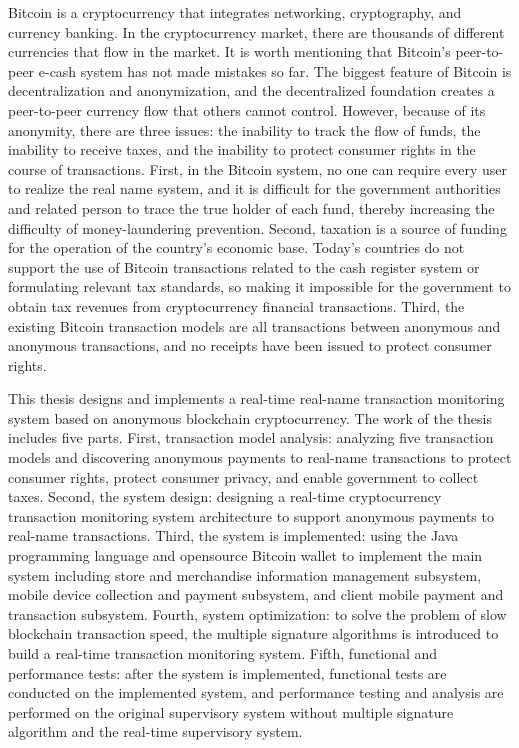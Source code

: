 \begin{eabstract}
	Bitcoin is a cryptocurrency that integrates networking, cryptography, and currency banking. In the cryptocurrency market, there are thousands of different currencies that flow in the market. It is worth mentioning that Bitcoin's peer-to-peer e-cash system has not made mistakes so far. The biggest feature of Bitcoin is decentralization and anonymization, and the decentralized foundation creates a peer-to-peer currency flow that others cannot control. However, because of its anonymity, there are three issues: the inability to track the flow of funds, the inability to receive taxes, and the inability to protect consumer rights in the course of transactions. First, in the Bitcoin system, no one can require every user to realize the real name system, and it is difficult for the government authorities and related person to trace the true holder of each fund, thereby increasing the difficulty of money-laundering prevention. Second, taxation is a source of funding for the operation of the country’s economic base. Today’s countries do not support the use of Bitcoin transactions related to the cash register system or formulating relevant tax standards, so making it impossible for the government to obtain tax revenues from cryptocurrency financial transactions. Third, the existing Bitcoin transaction models are all transactions between anonymous and anonymous transactions, and no receipts have been issued to protect consumer rights.

	This thesis designs and implements a real-time real-name transaction monitoring system based on anonymous blockchain cryptocurrency. The work of the thesis includes five parts. First, transaction model analysis: analyzing five transaction models and discovering anonymous payments to real-name transactions to protect consumer rights, protect consumer privacy, and enable government to collect taxes. Second, the system design: designing a real-time cryptocurrency transaction monitoring system architecture to support anonymous payments to real-name transactions. Third, the system is implemented: using the Java programming language and opensource Bitcoin wallet to implement the main system including store and merchandise information management subsystem, mobile device collection and payment subsystem, and client mobile payment and transaction subsystem. Fourth, system optimization: to solve the problem of slow blockchain transaction speed, the multiple signature algorithms is introduced to build a real-time transaction monitoring system. Fifth, functional and performance tests: after the system is implemented, functional tests are conducted on the implemented system, and performance testing and analysis are performed on the original supervisory system without multiple signature algorithm and the real-time supervisory system.

\end{eabstract}

